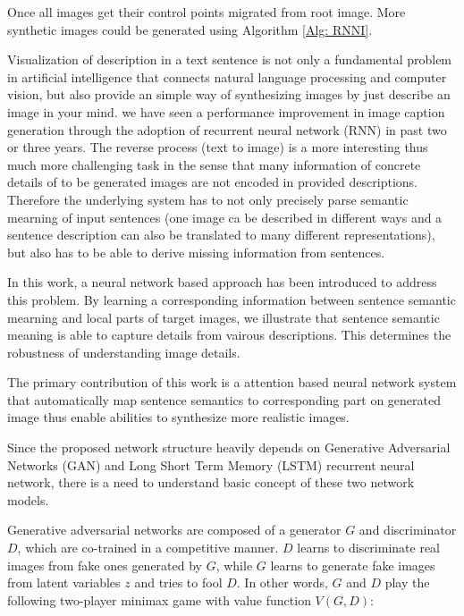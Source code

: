 \documentclass{iitthesis}
\begin{document}
Once all images get their control points migrated from root image. More synthetic images could be generated using Algorithm \ref{Alg: RNNI}.

 Visualization of description in a text sentence is not only a fundamental problem in artificial intelligence that connects natural language processing and computer vision, but also provide an simple way of synthesizing images by just describe an image in your mind. we have seen a performance improvement in image caption generation through the adoption of recurrent neural network (RNN) in past two or three years. The reverse process (text to image) is a more interesting thus much more challenging task in the sense that many information of concrete details of to be generated images are not encoded in provided descriptions. Therefore the underlying system has to not only precisely parse semantic mearning of input sentences (one image ca be described in different ways and a sentence description can also be translated to many different representations), but also has to be able to derive missing information from sentences. 

In this work, a neural network based approach has been introduced to address this problem. By learning a corresponding information between sentence semantic mearning and local parts of target images, we illustrate that sentence semantic meaning is able to capture details from vairous descriptions. This determines the robustness of understanding image details. 

The primary contribution of this work is a attention based neural network system that automatically map sentence semantics to corresponding part on generated image thus enable abilities to synthesize more realistic images.

Since the proposed network structure heavily depends on Generative Adversarial Networks (GAN) and Long Short Term Memory (LSTM) recurrent neural network, there is a need to understand basic concept of these two network models.

 Generative adversarial networks are composed of a generator $G$ and discriminator $D$, which are co-trained in a competitive manner. $D$ learns to discriminate real images from fake ones generated by $G$, while $G$ learns to generate fake images from latent variables $z$ and tries to fool $D$. In other words, $G$ and $D$ play the following two-player minimax game with value function $V(G, D)$:
\end{document}
